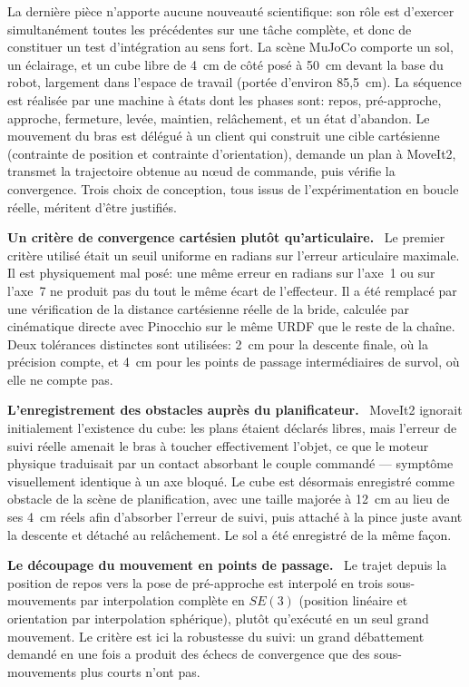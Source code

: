 \documentclass[a4paper, oneside]{article}
\newcommand{\parag}[1]{%
    \par\medskip\noindent\textbf{#1}\ \ignorespaces%
}
\begin{document}
La dernière pièce n'apporte aucune nouveauté scientifique: son rôle est
d'exercer simultanément toutes les précédentes sur une tâche complète, et donc
de constituer un test d'intégration au sens fort. La scène MuJoCo comporte un
sol, un éclairage, et un cube libre de 4~cm de côté posé à 50~cm devant la base
du robot, largement dans l'espace de travail (portée d'environ 85{,}5~cm). La
séquence est réalisée par une machine à états dont les phases sont: repos,
pré-approche, approche, fermeture, levée, maintien, relâchement, et un état
d'abandon. Le mouvement du bras est délégué à un client qui construit une cible
cartésienne (contrainte de position et contrainte d'orientation), demande un
plan à MoveIt2, transmet la trajectoire obtenue au n\oe ud de commande, puis
vérifie la convergence. Trois choix de conception, tous issus de
l'expérimentation en boucle réelle, méritent d'être justifiés.

\parag{Un critère de convergence cartésien plutôt qu'articulaire.} Le premier
critère utilisé était un seuil uniforme en radians sur l'erreur articulaire
maximale. Il est physiquement mal posé: une même erreur en radians sur l'axe~1
ou sur l'axe~7 ne produit pas du tout le même écart de l'effecteur. Il a été
remplacé par une vérification de la distance cartésienne réelle de la bride,
calculée par cinématique directe avec Pinocchio sur le même URDF que le reste de
la chaîne. Deux tolérances distinctes sont utilisées: 2~cm pour la descente
finale, où la précision compte, et 4~cm pour les points de passage
intermédiaires de survol, où elle ne compte pas.

\parag{L'enregistrement des obstacles auprès du planificateur.} MoveIt2
ignorait initialement l'existence du cube: les plans étaient déclarés libres,
mais l'erreur de suivi réelle amenait le bras à toucher effectivement l'objet,
ce que le moteur physique traduisait par un contact absorbant le couple
commandé — symptôme visuellement identique à un axe bloqué. Le cube est
désormais enregistré comme obstacle de la scène de planification, avec une
taille majorée à 12~cm au lieu de ses 4~cm réels afin d'absorber l'erreur de
suivi, puis attaché à la pince juste avant la descente et détaché au
relâchement. Le sol a été enregistré de la même façon.

\parag{Le découpage du mouvement en points de passage.} Le trajet depuis la
position de repos vers la pose de pré-approche est interpolé en trois
sous-mouvements par interpolation complète en $SE(3)$ (position linéaire et
orientation par interpolation sphérique), plutôt qu'exécuté en un seul grand
mouvement. Le critère est ici la robustesse du suivi: un grand débattement
demandé en une fois a produit des échecs de convergence que des sous-mouvements
plus courts n'ont pas.
\end{document}

